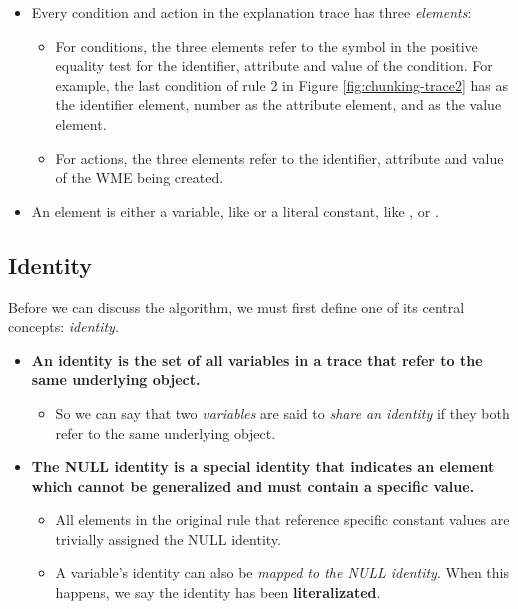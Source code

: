 \begin{itemize}
	\item Every condition and action in the explanation trace has three \textit{elements}:
	
	\begin{itemize}
		\item For conditions, the three elements refer to the symbol in the positive equality test for the identifier, attribute and value of the condition.  For example, the last condition of rule 2 in Figure \ref{fig:chunking-trace2} has  as the identifier element, number as the attribute element, and  as the value element.
		
		\item For actions, the three elements refer to the identifier, attribute and value of the WME being created.
	\end{itemize}
	
	\item An element is either a variable, like    or a literal constant, like  ,    or   .
	
\end{itemize}

\subsection{Identity}

Before we can discuss the algorithm, we must first define one of its central concepts: \textit{identity}.  

\begin{itemize}
	\item \textbf{An identity is the set of all variables in a trace that refer to the same underlying object.}
	\begin{itemize}
		\item So we can say that two \textit{variables} are said to \textit{share an identity} if they both refer to the same underlying object.
	\end{itemize}
	\item \textbf{The NULL identity is a special identity that indicates an element which cannot be generalized and must contain a specific value.}
	\begin{itemize}
		\item All elements in the original rule that reference specific constant values are trivially assigned the NULL identity.
		\item A variable's identity can also be \textit{mapped to the NULL identity}.  When this happens, we say the identity has been \textbf{literalizated}.
	\end{itemize}
\end{itemize}


